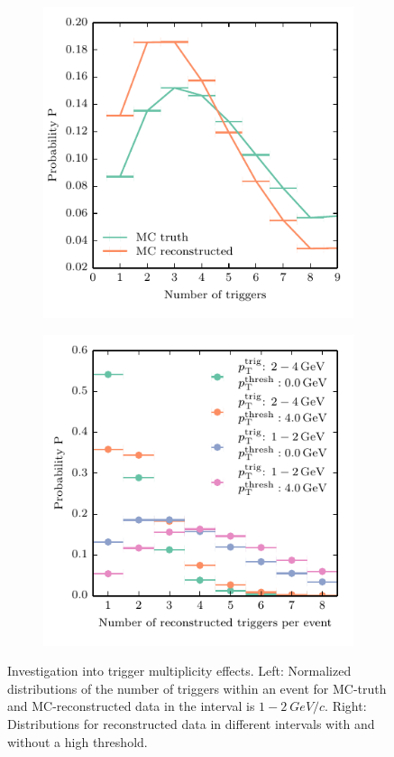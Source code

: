 \begin{figure}[htbp]
  \centering
  \begin{subfigure}[b]{0.5\textwidth}
      \includegraphics{figures/distribution_triggers.pdf}
  \end{subfigure}%
  \begin{subfigure}[b]{0.5\textwidth}
    \includegraphics{figures/trigger_distribution.pdf}
  \end{subfigure}
  \caption[Investigation into trigger multiplicity effects.]{Investigation into trigger multiplicity effects. Left: Normalized distributions of the number of triggers within an event for MC-truth and MC-reconstructed data in the \pttrig interval is $1-\SI{2}{GeV/c}$. Right: Distributions for reconstructed data in different \pttrig intervals with and without a high \pt threshold.}
  \label{fig:trigger_distribution}
\end{figure}


